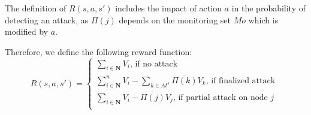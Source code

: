 The definition of $R(s,a,s')$ includes the impact of action $a$ in the probability of detecting an attack, as $\Pi(j)$ depends on the monitoring set $Mo$ which is modified by $a$.

Therefore, we define the following reward function: 
\vspace{-20pt}
\begin{equation}
  R(s,a,s') =\begin{cases}
    \sum\limits_{i\in \textbf{N}} V_i \text{, if no attack}\\
    \sum\limits_{i\in \textbf{N}}^n V_i - \sum\limits_{k \in At^s} \overline{\Pi(k)}V_k \text{, if finalized attack }\\
    \sum\limits_{i\in \textbf{N}} V_i - \overline{\Pi(j)}V_j \text{, if partial attack on node $j$}\\
  \end{cases}
\end{equation}
